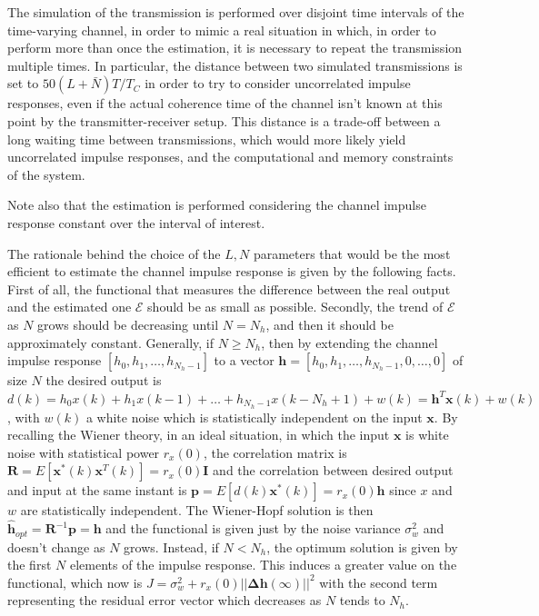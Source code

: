 \documentclass[10pt]{article}
\begin{document}
The simulation of the transmission is performed over disjoint time intervals of the time-varying channel, in order to mimic a real situation in which, in order to perform more than once the estimation, it is necessary to repeat the transmission multiple times. In particular, the distance between two simulated transmissions is set to $50(L+\bar{N})T/T_C$ in order to try to consider uncorrelated impulse responses, even if the actual coherence time of the channel isn't known at this point by the transmitter-receiver setup. This distance is a trade-off between a long waiting time between transmissions, which would more likely yield uncorrelated impulse responses, and the computational and memory constraints of the system.

Note also that the estimation is performed considering the channel impulse response constant over the interval of interest.

The rationale behind the choice of the $L, N$ parameters that would be the most efficient to estimate the channel impulse response is given by the following facts. First of all, the functional that measures the difference between the real output and the estimated one $\mathcal{E}$ should be as small as possible. Secondly, the trend of $\mathcal{E}$ as $N$ grows should be decreasing until $N=N_h$, and then it should be approximately constant.
Generally, if $N \ge N_h$, then by extending the channel impulse response $[h_0, h_1, \dots, h_{N_h - 1}]$ to a vector $\mathbf{h} = [h_0, h_1, \dots, h_{N_h - 1}, 0, \dots, 0]$ of size $N$ the desired output is $d(k) = h_0x(k) + h_1x(k-1) + \dots + h_{N_h - 1}x(k-N_h + 1) + w(k) = \mathbf{h}^T\mathbf{x}(k) + w(k)$, with $w(k)$ a white noise which is statistically independent on the input $\mathbf{x}$.
By recalling the Wiener theory, in an ideal situation, in which the input $\mathbf{x}$ is white noise with statistical power $r_x(0)$, the correlation matrix is $\mathbf{R} = E[\mathbf{x}^*(k)\mathbf{x}^T(k)] = r_x(0)\mathbf{I}$ and the correlation between desired output and input at the same instant is $\mathbf{p} = E[d(k)\mathbf{x}^*(k)] = r_x(0)\mathbf{h}$ since $x$ and $w$ are statistically independent. The Wiener-Hopf solution is then $\hat{\mathbf{h}}_{opt} =\mathbf{R}^{-1} \mathbf{p} = \mathbf{h}$
and the functional is given just by the noise variance $\sigma_w^2$ and doesn't change as $N$ grows. Instead, if $N < N_h$, the optimum solution is given by the first $N$ elements of the impulse response. This induces a greater value on the functional, which now is $J = \sigma_w^2 + r_x(0)||\mathbf{\Delta h}(\infty)||^2$ with the second term representing the residual error vector which decreases as $N$ tends to $N_h$.
\end{document}
